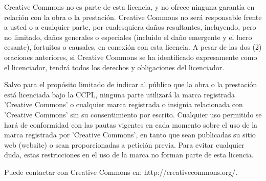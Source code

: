           \par Creative Commons no es parte de esta licencia, y no ofrece ninguna garantía en relación con la obra o la prestación. Creative Commons no será responsable frente a usted o a cualquier parte, por cualesquiera daños resultantes, incluyendo, pero no limitado, daños generales o especiales (incluido el daño emergente y el lucro cesante), fortuitos o causales, en conexión con esta licencia. A pesar de las dos (2) oraciones anteriores, si Creative Commons se ha identificado expresamente como el licenciador, tendrá todos los derechos y obligaciones del licenciador. \\

          \par Salvo para el propósito limitado de indicar al público que la obra o la prestación está licenciada bajo la CCPL, ninguna parte utilizará la marca registrada 'Creative Commons' o cualquier marca registrada o insignia relacionada con 'Creative Commons' sin su consentimiento por escrito. Cualquier uso permitido se hará de conformidad con las pautas vigentes en cada momento sobre el uso de la marca registrada por 'Creative Commons', en tanto que sean publicadas su sitio web (website) o sean proporcionadas a petición previa. Para evitar cualquier duda, estas restricciones en el uso de la marca no forman parte de esta licencia. \\

          \par Puede contactar con Creative Commons en: http://creativecommons.org/.
        
      
    

